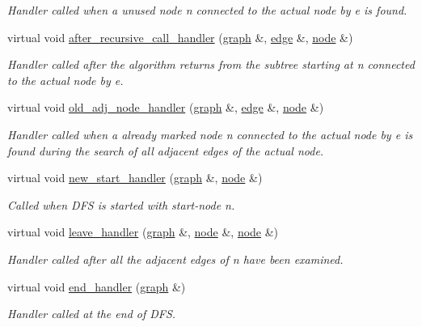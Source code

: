 \begin{DoxyCompactItemize}
\begin{DoxyCompactList}\small\item\em Handler called when a unused node {\itshape n} connected to the actual node by {\itshape e} is found. \end{DoxyCompactList}\item 
virtual void \mbox{\hyperlink{classbiconnectivity_a69ca91409485b57c486b188596080d7a}{after\+\_\+recursive\+\_\+call\+\_\+handler}} (\mbox{\hyperlink{classgraph}{graph}} \&, \mbox{\hyperlink{classedge}{edge}} \&, \mbox{\hyperlink{classnode}{node}} \&)
\begin{DoxyCompactList}\small\item\em Handler called after the algorithm returns from the subtree starting at {\itshape n} connected to the actual node by {\itshape e}. \end{DoxyCompactList}\item 
virtual void \mbox{\hyperlink{classbiconnectivity_a92228b87472140374dffea7d9f7ee20d}{old\+\_\+adj\+\_\+node\+\_\+handler}} (\mbox{\hyperlink{classgraph}{graph}} \&, \mbox{\hyperlink{classedge}{edge}} \&, \mbox{\hyperlink{classnode}{node}} \&)
\begin{DoxyCompactList}\small\item\em Handler called when a already marked node {\itshape n} connected to the actual node by {\itshape e} is found during the search of all adjacent edges of the actual node. \end{DoxyCompactList}\item 
virtual void \mbox{\hyperlink{classbiconnectivity_ae94213830755f1f4d477ec6bff0f25b8}{new\+\_\+start\+\_\+handler}} (\mbox{\hyperlink{classgraph}{graph}} \&, \mbox{\hyperlink{classnode}{node}} \&)
\begin{DoxyCompactList}\small\item\em Called when D\+FS is started with start-\/node {\itshape n}. \end{DoxyCompactList}\item 
virtual void \mbox{\hyperlink{classbiconnectivity_a868587fdc4dbb3bf80899d1c7d49b558}{leave\+\_\+handler}} (\mbox{\hyperlink{classgraph}{graph}} \&, \mbox{\hyperlink{classnode}{node}} \&, \mbox{\hyperlink{classnode}{node}} \&)
\begin{DoxyCompactList}\small\item\em Handler called after all the adjacent edges of {\itshape n} have been examined. \end{DoxyCompactList}\item 
virtual void \mbox{\hyperlink{classbiconnectivity_a2583331a4561f3db221ab674d2e5d75e}{end\+\_\+handler}} (\mbox{\hyperlink{classgraph}{graph}} \&)
\begin{DoxyCompactList}\small\item\em Handler called at the end of D\+FS. \end{DoxyCompactList}\end{DoxyCompactItemize}
